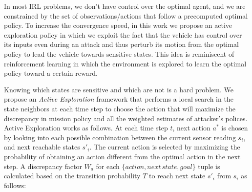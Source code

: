 \documentclass[letterpaper, 10 pt, conference]{ieeeconf}  %
\begin{document}

In most IRL problems, we don't have control over the optimal agent, and we are constrained by the set of observations/actions that follow a precomputed optimal policy. To increase the convergence speed, in this work we propose an active exploration policy in which we exploit the fact that the vehicle has control over its inputs even during an attack and thus perturb its motion from the optimal policy to lead the vehicle towards sensitive states. This idea is reminiscent of reinforcement learning in which the environment is explored to learn the optimal policy toward a certain reward.



Knowing which states are sensitive and which are not is a hard problem. We propose an \textit{Active Exploration} framework that performs a local search in the state neighbors at each time step to choose the action that will maximize the discrepancy in mission policy and all the weighted estimates of attacker's polices.
Active Exploration works as follows. At each time step $t$, next action $a^*$ is chosen by looking into each possible combination between the current sensor reading $s_i$, and next reachable states $s'_i$. The current action is selected by maximizing the probability of obtaining an action different from the optimal action in the next step. A discrepancy factor $W_a$ for each $\{action, next\,state, goal\}$ tuple is calculated based on the transition probability $T$ to reach next state $s'_i$ from $s_i$ as follows:
\end{document}

